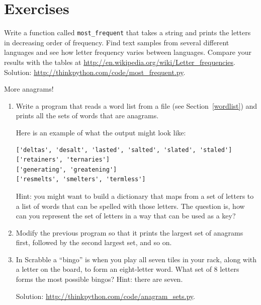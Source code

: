 \documentclass[10pt]{book}
\begin{document}
\section{Exercises}

\begin{exercise}

Write a function called \verb"most_frequent" that takes a string and
prints the letters in decreasing order of frequency.  Find text
samples from several different languages and see how letter frequency
varies between languages.  Compare your results with the tables at
\url{http://en.wikipedia.org/wiki/Letter_frequencies}.  Solution:
\url{http://thinkpython.com/code/most_frequent.py}.   

\end{exercise}


\begin{exercise}
\label{anagrams}

More anagrams!

\begin{enumerate}

\item Write a program
that reads a word list from a file (see Section~\ref{wordlist}) and
prints all the sets of words that are anagrams.

Here is an example of what the output might look like:

\begin{verbatim}
['deltas', 'desalt', 'lasted', 'salted', 'slated', 'staled']
['retainers', 'ternaries']
['generating', 'greatening']
['resmelts', 'smelters', 'termless']
\end{verbatim}
%
Hint: you might want to build a dictionary that maps from a
set of letters to a list of words that can be spelled with those
letters.  The question is, how can you represent the set of
letters in a way that can be used as a key?

\item Modify the previous program so that it prints the largest set
of anagrams first, followed by the second largest set, and so on.

\item In Scrabble a ``bingo'' is when you play all seven tiles in
your rack, along with a letter on the board, to form an eight-letter
word.  What set of 8 letters forms the most possible bingos?
Hint: there are seven.


Solution: \url{http://thinkpython.com/code/anagram_sets.py}.

\end{enumerate}
\end{exercise}
\end{document}
